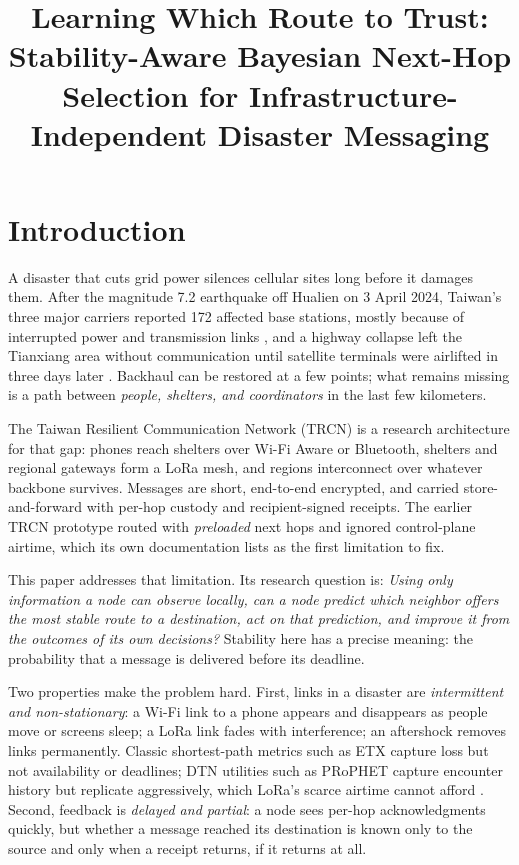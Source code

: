 \documentclass[jou,a4paper,11pt,floatsintext]{apa7}
\title{Learning Which Route to Trust: Stability-Aware Bayesian Next-Hop Selection for Infrastructure-Independent Disaster Messaging}
\begin{document}
\maketitle

\section{Introduction}

A disaster that cuts grid power silences cellular sites long before it damages them. After the magnitude 7.2 earthquake off Hualien on 3 April 2024, Taiwan's three major carriers reported 172 affected base stations, mostly because of interrupted power and transmission links \parencite{cna2024}, and a highway collapse left the Tianxiang area without communication until satellite terminals were airlifted in three days later \parencite{moda2024}. Backhaul can be restored at a few points; what remains missing is a path between \emph{people, shelters, and coordinators} in the last few kilometers.

The Taiwan Resilient Communication Network (TRCN) is a research architecture for that gap: phones reach shelters over Wi-Fi Aware or Bluetooth, shelters and regional gateways form a LoRa mesh, and regions interconnect over whatever backbone survives. Messages are short, end-to-end encrypted, and carried store-and-forward with per-hop custody and recipient-signed receipts. The earlier TRCN prototype routed with \emph{preloaded} next hops and ignored control-plane airtime, which its own documentation lists as the first limitation to fix.

This paper addresses that limitation. Its research question is: \emph{Using only information a node can observe locally, can a node predict which neighbor offers the most stable route to a destination, act on that prediction, and improve it from the outcomes of its own decisions?} Stability here has a precise meaning: the probability that a message is delivered before its deadline.

Two properties make the problem hard. First, links in a disaster are \emph{intermittent and non-stationary}: a Wi-Fi link to a phone appears and disappears as people move or screens sleep; a LoRa link fades with interference; an aftershock removes links permanently. Classic shortest-path metrics such as ETX \parencite{decouto2003} capture loss but not availability or deadlines; DTN utilities such as PRoPHET \parencite{lindgren2003} capture encounter history but replicate aggressively, which LoRa's scarce airtime cannot afford \parencite{bor2016}. Second, feedback is \emph{delayed and partial}: a node sees per-hop acknowledgments quickly, but whether a message reached its destination is known only to the source and only when a receipt returns, if it returns at all.
\end{document}
